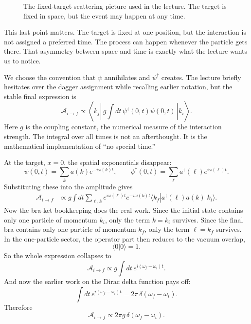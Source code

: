\begin{figure}[h]
\centering
{}
\caption{The fixed-target scattering picture used in the lecture. The target is fixed in space, but the event may happen at any time.}
\end{figure}

This last point matters. The target is fixed at one position, but the interaction is not assigned a preferred time. The process can happen whenever the particle gets there. That asymmetry between space and time is exactly what the lecture wants us to notice.

We choose the convention that \(\psi\) annihilates and \(\psi^\dagger\) creates. The lecture briefly hesitates over the dagger assignment while recalling earlier notation, but the stable final expression is
\begin{equation}
\mathcal A_{i\to f}\propto \left\langle k_f\left|\,g\int dt\,\psi^\dagger(0,t)\psi(0,t)\,\right|k_i\right\rangle.
\end{equation}
Here \(g\) is the coupling constant, the numerical measure of the interaction strength. The integral over all times is not an afterthought. It is the mathematical implementation of ``no special time.''

At the target, \(x=0\), the spatial exponentials disappear:
\begin{equation}
\psi(0,t)=\sum_k a(k)e^{-i\omega(k)t},
\qquad
\psi^\dagger(0,t)=\sum_\ell a^\dagger(\ell)e^{i\omega(\ell)t}.
\end{equation}
Substituting these into the amplitude gives
\begin{align}
\mathcal A_{i\to f}
&\propto
g\int dt
\sum_{\ell,k}
e^{i\omega(\ell)t}e^{-i\omega(k)t}
\langle k_f|a^\dagger(\ell)a(k)|k_i\rangle.
\end{align}
Now the bra-ket bookkeeping does the real work. Since the initial state contains only one particle of momentum \(k_i\), only the term \(k=k_i\) survives. Since the final bra contains only one particle of momentum \(k_f\), only the term \(\ell=k_f\) survives. In the one-particle sector, the operator part then reduces to the vacuum overlap,
\[
\langle 0|0\rangle=1.
\]
So the whole expression collapses to
\begin{equation}
\mathcal A_{i\to f}\propto g\int dt\,e^{i(\omega_f-\omega_i)t}.
\end{equation}
And now the earlier work on the Dirac delta function pays off:
\begin{equation}
\int dt\,e^{i(\omega_f-\omega_i)t}=2\pi\,\delta(\omega_f-\omega_i).
\end{equation}
Therefore
\begin{equation}
\mathcal A_{i\to f}\propto 2\pi g\,\delta(\omega_f-\omega_i).
\end{equation}

